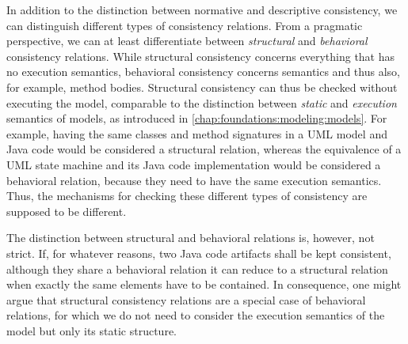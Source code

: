 In addition to the distinction between normative and descriptive consistency, we can distinguish different types of consistency relations.
From a pragmatic perspective, we can at least differentiate between \emph{structural} and \emph{behavioral} consistency relations.
While structural consistency concerns everything that has no execution semantics, behavioral consistency concerns semantics and thus also, for example, method bodies.
Structural consistency can thus be checked without executing the model, comparable to the distinction between \emph{static} and \emph{execution} semantics of models, as introduced in \autoref{chap:foundations:modeling:models}.
For example, having the same classes and method signatures in a \gls{UML} model and Java code would be considered a structural relation, whereas the equivalence of a \gls{UML} state machine and its Java code implementation would be considered a behavioral relation, because they need to have the same execution semantics.
Thus, the mechanisms for checking these different types of consistency are supposed to be different.

The distinction between structural and behavioral relations is, however, not strict.
If, for whatever reasons, two Java code artifacts shall be kept consistent, although they share a behavioral relation it can reduce to a structural relation when exactly the same elements have to be contained.
In consequence, one might argue that structural consistency relations are a special case of behavioral relations, for which we do not need to consider the execution semantics of the model but only its static structure.

